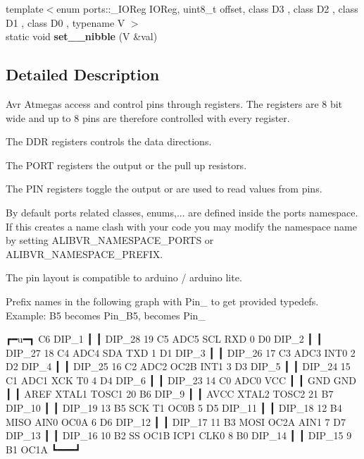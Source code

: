 \begin{DoxyCompactItemize}
\item 
{\footnotesize template$<$enum ports\+::\+\_\+\+I\+O\+Reg I\+O\+Reg, uint8\+\_\+t offset, class D3 , class D2 , class D1 , class D0 , typename V $>$ }\\static void {\bfseries set\+\_\+\_\+nibble} (V \&val)\hypertarget{namespaceports_af6f06d849f89492a6d3603f926c4595b}{}\label{namespaceports_af6f06d849f89492a6d3603f926c4595b}

\end{DoxyCompactItemize}


\subsection{Detailed Description}
Avr Atmegas access and control pins through registers. The registers are 8 bit wide and up to 8 pins are therefore controlled with every register. 


\begin{DoxyItemize}
\item The D\+DR registers controls the data directions.
\item The P\+O\+RT registers the output or the pull up resistors.
\item The P\+IN registers toggle the output or are used to read values from pins.
\end{DoxyItemize}

By default ports related classes, enums,... are defined inside the {\ttfamily ports} namespace. If this creates a name clash with your code you may modify the namespace name by setting A\+L\+I\+B\+V\+R\+\_\+\+N\+A\+M\+E\+S\+P\+A\+C\+E\+\_\+\+P\+O\+R\+TS or A\+L\+I\+B\+V\+R\+\_\+\+N\+A\+M\+E\+S\+P\+A\+C\+E\+\_\+\+P\+R\+E\+F\+IX.

The pin layout is compatible to arduino / arduino lite.

Prefix names in the following graph with {\ttfamily Pin\+\_\+} to get provided {\ttfamily typedef}s. Example\+: {\ttfamily B5} becomes {\ttfamily Pin\+\_\+\+B5}, {} becomes {\ttfamily Pin\+\_}


\begin{DoxyCode}
                                 ┏━u━┓
                     C6    DIP\_1 ┃   ┃ DIP\_28   19   C5   ADC5   SCL
RXD              0   D0    DIP\_2 ┃   ┃ DIP\_27   18   C4   ADC4   SDA
TXD              1   D1    DIP\_3 ┃   ┃ DIP\_26   17   C3   ADC3
        INT0     2   D2    DIP\_4 ┃   ┃ DIP\_25   16   C2   ADC2
OC2B    INT1     3   D3    DIP\_5 ┃   ┃ DIP\_24   15   C1   ADC1
XCK     T0       4   D4    DIP\_6 ┃   ┃ DIP\_23   14   C0   ADC0
                             VCC ┃   ┃ GND
                             GND ┃   ┃ AREF
XTAL1   TOSC1   20   B6    DIP\_9 ┃   ┃ AVCC
XTAL2   TOSC2   21   B7   DIP\_10 ┃   ┃ DIP\_19   13   B5   SCK
T1      OC0B     5   D5   DIP\_11 ┃   ┃ DIP\_18   12   B4   MISO
AIN0    OC0A     6   D6   DIP\_12 ┃   ┃ DIP\_17   11   B3   MOSI   OC2A
AIN1             7   D7   DIP\_13 ┃   ┃ DIP\_16   10   B2   SS     OC1B
ICP1    CLK0     8   B0   DIP\_14 ┃   ┃ DIP\_15    9   B1          OC1A
                                 ┗━━━┛
\end{DoxyCode}
 

